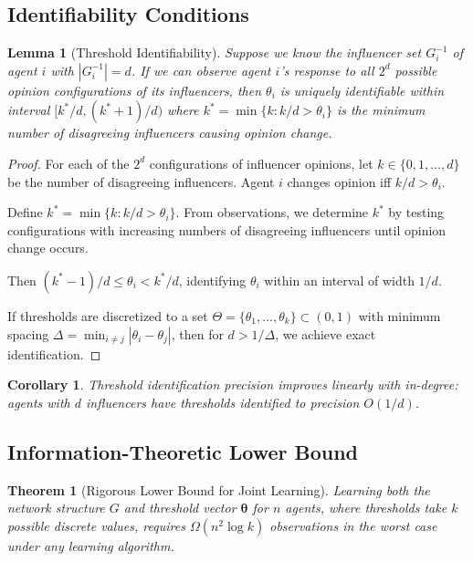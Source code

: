 \documentclass[11pt]{article}
\newtheorem{theorem}{Theorem}
\newtheorem{lemma}{Lemma}
\newtheorem{corollary}{Corollary}
\begin{document}
\subsection{Identifiability Conditions}

\begin{lemma}[Threshold Identifiability]
\label{lem:threshold_identifiable}
Suppose we know the influencer set $G_i^{-1}$ of agent $i$ with $|G_i^{-1}| = d$. If we can observe agent $i$'s response to all $2^d$ possible opinion configurations of its influencers, then $\theta_i$ is uniquely identifiable within interval $[k^*/d, (k^*+1)/d)$ where $k^* = \min\{k : k/d > \theta_i\}$ is the minimum number of disagreeing influencers causing opinion change.
\end{lemma}

\begin{proof}
For each of the $2^d$ configurations of influencer opinions, let $k \in \{0, 1, \ldots, d\}$ be the number of disagreeing influencers. Agent $i$ changes opinion iff $k/d > \theta_i$.

Define $k^* = \min\{k : k/d > \theta_i\}$. From observations, we determine $k^*$ by testing configurations with increasing numbers of disagreeing influencers until opinion change occurs.

Then $(k^*-1)/d \leq \theta_i < k^*/d$, identifying $\theta_i$ within an interval of width $1/d$.

If thresholds are discretized to a set $\Theta = \{\theta_1, \ldots, \theta_k\} \subset (0,1)$ with minimum spacing $\Delta = \min_{i \neq j} |\theta_i - \theta_j|$, then for $d > 1/\Delta$, we achieve exact identification.
\end{proof}

\begin{corollary}
\label{cor:precision_scaling}
Threshold identification precision improves linearly with in-degree: agents with $d$ influencers have thresholds identified to precision $O(1/d)$.
\end{corollary}

\subsection{Information-Theoretic Lower Bound}

\begin{theorem}[Rigorous Lower Bound for Joint Learning]
\label{thm:lower_bound_rigorous}
Learning both the network structure $G$ and threshold vector $\boldsymbol{\theta}$ for $n$ agents, where thresholds take $k$ possible discrete values, requires $\Omega(n^2 \log k)$ observations in the worst case under any learning algorithm.
\end{theorem}
\end{document}
